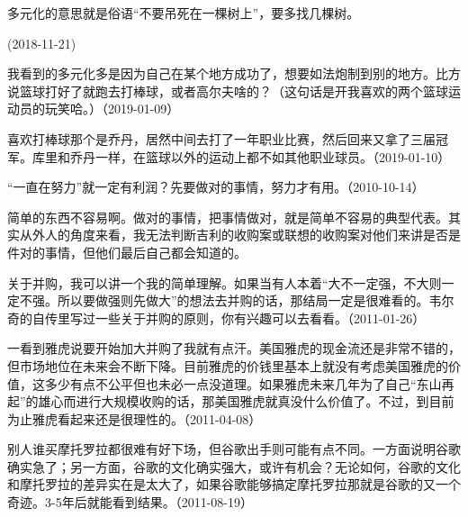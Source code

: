 
多元化的意思就是俗语“不要吊死在一棵树上”，要多找几棵树。

(2018-11-21)

我看到的多元化多是因为自己在某个地方成功了，想要如法炮制到别的地方。比方说篮球打好了就跑去打棒球，或者高尔夫啥的？（这句话是开我喜欢的两个篮球运动员的玩笑哈。）（2019-01-09）

喜欢打棒球那个是乔丹，居然中间去打了一年职业比赛，然后回来又拿了三届冠军。库里和乔丹一样，在篮球以外的运动上都不如其他职业球员。（2019-01-10）


“一直在努力”就一定有利润？先要做对的事情，努力才有用。（2010-10-14）


简单的东西不容易啊。做对的事情，把事情做对，就是简单不容易的典型代表。其实从外人的角度来看，我无法判断吉利的收购案或联想的收购案对他们来讲是否是件对的事情，但他们最后自己都会知道的。

关于并购，我可以讲一个我的简单理解。如果当有人本着“大不一定强，不大则一定不强。所以要做强则先做大”的想法去并购的话，那结局一定是很难看的。韦尔奇的自传里写过一些关于并购的原则，你有兴趣可以去看看。（2011-01-26）


一看到雅虎说要开始加大并购了我就有点汗。美国雅虎的现金流还是非常不错的，但市场地位在未来会不断下降。目前雅虎的价钱里基本上就没有考虑美国雅虎的价值，这多少有点不公平但也未必一点没道理。如果雅虎未来几年为了自己“东山再起”的雄心而进行大规模收购的话，那美国雅虎就真没什么价值了。不过，到目前为止雅虎看起来还是很理性的。（2011-04-08）


别人谁买摩托罗拉都很难有好下场，但谷歌出手则可能有点不同。一方面说明谷歌确实急了；另一方面，谷歌的文化确实强大，或许有机会？无论如何，谷歌的文化和摩托罗拉的差异实在是太大了，如果谷歌能够搞定摩托罗拉那就是谷歌的又一个奇迹。3-5年后就能看到结果。（2011-08-19）


